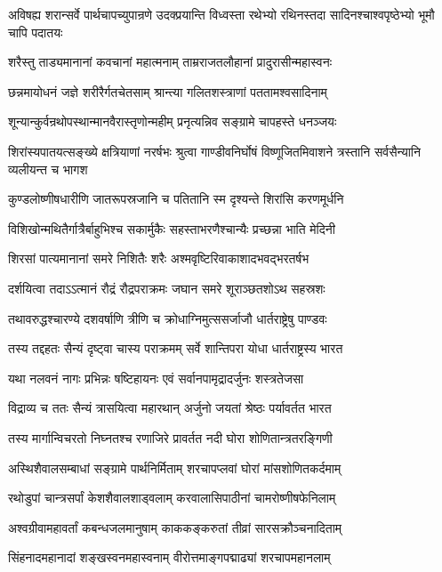 \threelineshloka
{अविषह्य शरान्सर्वे पार्थचापच्युपान्रणे}
{उदक्प्रयान्ति विध्वस्ता रथेभ्यो रथिनस्तदा}
{सादिनश्चाश्वपृष्ठेभ्यो भूमौ चापि पदातयः}


\twolineshloka
{शरैस्तु ताड्यमानानां कवचानां महात्मनाम्}
{ताम्रराजतलौहानां प्रादुरासीन्महास्वनः}


\twolineshloka
{छन्नमायोधनं जज्ञे शरीरैर्गतचेतसाम्}
{श्रान्त्या गलितशस्त्राणां पततामश्वसादिनाम्}


\twolineshloka
{शून्यान्कुर्वन्रथोपस्थान्मानवैरास्तृणोन्महीम्}
{प्रनृत्यन्निव सङ्ग्रामे चापहस्ते धनञ्जयः}


\threelineshloka
{शिरांस्यपातयत्सङ्ख्ये क्षत्रियाणां नरर्षभः}
{श्रुत्वा गाण्डीवनिर्घोषं विष्णूजितमिवाशने}
{त्रस्तानि सर्वसैन्यानि व्यलीयन्त च भागश}


\twolineshloka
{कुण्डलोष्णीषधारीणि जातरूपस्रजानि च}
{पतितानि स्म दृश्यन्ते शिरांसि करणमूर्धनि}


\twolineshloka
{विशिखोन्मथितैर्गात्रैर्बाहुभिश्च सकार्मुकैः}
{सहस्ताभरणैश्चान्यैः प्रच्छन्ना भाति मेदिनी}


\twolineshloka
{शिरसां पात्यमानानां समरे निशितैः शरैः}
{अश्मवृष्टिरिवाकाशादभवद्भरतर्षभ}


\twolineshloka
{दर्शयित्वा तदाऽऽत्मानं रौद्रं रौद्रपराक्रमः}
{जघान समरे शूराञ्छतशोऽथ सहस्रशः}


\twolineshloka
{तथावरुद्धश्चारण्ये दशवर्षाणि त्रीणि च}
{क्रोधाग्निमुत्ससर्जाजौ धार्तराष्ट्रेषु पाण्डवः}


\twolineshloka
{तस्य तद्दहतः सैन्यं दृष्ट्वा चास्य पराक्रमम्}
{सर्वे शान्तिपरा योधा धार्तराष्ट्रस्य भारत}


\twolineshloka
{यथा नलवनं नागः प्रभिन्नः षष्टिहायनः}
{एवं सर्वानपामृद्रादर्जुनः शस्त्रतेजसा}


\twolineshloka
{विद्राव्य च ततः सैन्यं त्रासयित्वा महारथान्}
{अर्जुनो जयतां श्रेष्ठः पर्यावर्तत भारत}


\twolineshloka
{तस्य मार्गान्विचरतो निघ्नतश्च रणाजिरे}
{प्रावर्तत नदी घोरा शोणितान्त्रतरङ्गिणी}


\twolineshloka
{अस्थिशैवालसम्बाधां सङ्ग्रामे पार्थनिर्मिताम्}
{शरचापप्लवां घोरां मांसशोणितकर्दमाम्}


\twolineshloka
{रथोडुपां चान्त्रसर्पां केशशैवालशाड्वलाम्}
{करवालासिपाठीनां चामरोष्णीषफेनिलाम्}


\twolineshloka
{अश्वग्रीवामहावर्तां कबन्धजलमानुषाम्}
{काककङ्करुतां तीव्रां सारसक्रौञ्चनादिताम्}


\twolineshloka
{सिंहनादमहानादां शङ्खस्वनमहास्वनाम्}
{वीरोत्तमाङ्गपद्माढ्यां शरचापमहानलाम्}


